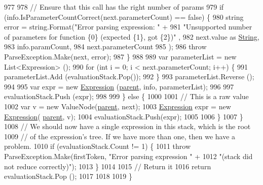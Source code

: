 \begin{DoxyCode}
977 
978                         \textcolor{comment}{// Ensure that this call has the right number of params}
979                         \textcolor{keywordflow}{if} (info.IsParameterCountCorrect(next.parameterCount) == \textcolor{keyword}{false}) \{
980                             \textcolor{keywordtype}{string} error = string.Format(\textcolor{stringliteral}{"Error parsing expression: "} +
981                                 \textcolor{stringliteral}{"Unsupported number of parameters for function \{0\} (expected \{1\}, got \{2\})"}
      ,
982                                 next.value as \hyperlink{a00026_a301aa7c866593a5b625a8fc158bbeacea27118326006d3829667a400ad23d5d98}{String},
983                                 info.paramCount,
984                                 next.parameterCount
985                             );
986                             \textcolor{keywordflow}{throw} ParseException.Make(next, error);
987                         \}
988 
989                         var parameterList = \textcolor{keyword}{new} List<Expression> ();
990                         \textcolor{keywordflow}{for} (\textcolor{keywordtype}{int} i = 0; i < next.parameterCount; i++) \{
991                             parameterList.Add (evaluationStack.Pop());
992                         \}
993                         parameterList.Reverse ();
994 
995                         var expr = \textcolor{keyword}{new} \hyperlink{a00040_a91f0536300ebb39eaf9b7526c7e97364}{Expression} (\hyperlink{a00063_af313a82103fcc2ff5a177dbb06b92f7b}{parent}, info, parameterList);
996 
997                         evaluationStack.Push (expr);
998 
999                     \} \textcolor{keywordflow}{else} \{
1000 
1001                         \textcolor{comment}{// This is a raw value}
1002                         var v = \textcolor{keyword}{new} ValueNode(\hyperlink{a00063_af313a82103fcc2ff5a177dbb06b92f7b}{parent}, next);
1003                         \hyperlink{a00040_a91f0536300ebb39eaf9b7526c7e97364}{Expression} expr = \textcolor{keyword}{new} \hyperlink{a00040_a91f0536300ebb39eaf9b7526c7e97364}{Expression}(
      \hyperlink{a00063_af313a82103fcc2ff5a177dbb06b92f7b}{parent}, v);
1004                         evaluationStack.Push(expr);
1005 
1006                     \}
1007                 \}
1008                 \textcolor{comment}{// We should now have a single expression in this stack, which is the root}
1009                 \textcolor{comment}{// of the expression's tree. If we have more than one, then we have a problem.}
1010                 \textcolor{keywordflow}{if} (evaluationStack.Count != 1) \{
1011                     \textcolor{keywordflow}{throw} ParseException.Make(firstToken, \textcolor{stringliteral}{"Error parsing expression "} +
1012                         \textcolor{stringliteral}{"(stack did not reduce correctly)"});
1013                 \}
1014 
1015                 \textcolor{comment}{// Return it}
1016                 \textcolor{keywordflow}{return} evaluationStack.Pop ();
1017 
1018 
1019             \}
\end{DoxyCode}
